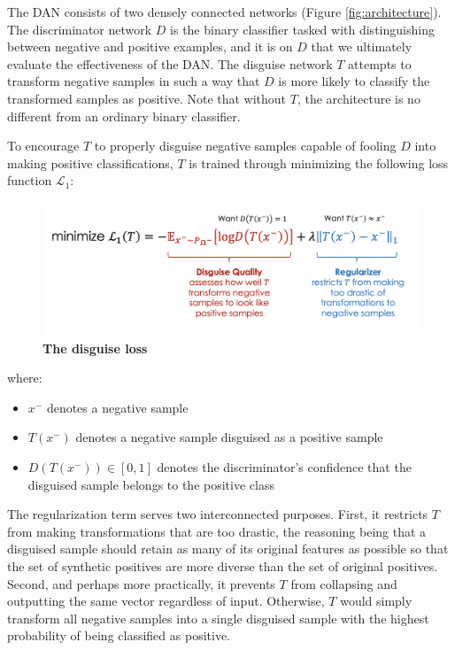 \documentclass{proc}
\begin{document}
The DAN consists of two densely connected networks (Figure \ref{fig:architecture}). The discriminator network $D$ is the binary classifier tasked with distinguishing between negative and positive examples, and it is on $D$ that we ultimately evaluate the effectiveness of the DAN. The disguise network $T$ attempts to transform negative samples in such a way that $D$ is more likely to classify the transformed samples as positive. Note that without $T$, the architecture is no different from an ordinary binary classifier.

To encourage $T$ to properly disguise negative samples capable of fooling $D$ into making positive classifications, $T$ is trained through minimizing the following loss function $\mathcal{L}_1$:

\begin{figure}[h!]
		\includegraphics*[scale=0.22]{../figures/disguise-loss.png}
		\caption{\textbf{The disguise loss}}
		\label{fig:disguise-loss}
\end{figure}

where:

\begin{itemize}
\item{$x^-$ denotes a negative sample}
\item{$T(x^-)$ denotes a negative sample disguised as a positive sample}
\item{$D(T(x^-)) \in [0, 1]$ denotes the discriminator's confidence that the disguised sample belongs to the positive class}
\end{itemize}

The regularization term serves two interconnected purposes. First, it restricts $T$ from making transformations that are too drastic, the reasoning being that a disguised sample should retain as many of its original features as possible so that the set of synthetic positives are more diverse than the set of original positives. Second, and perhaps more practically, it prevents $T$ from collapsing and outputting the same vector regardless of input. Otherwise, $T$ would simply transform all negative samples into a single disguised sample with the highest probability of being classified as positive.
\end{document}
